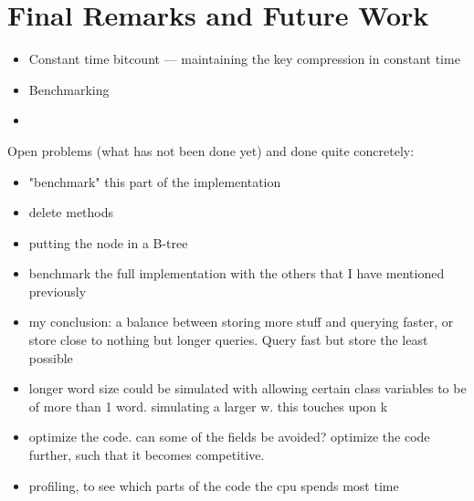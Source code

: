 
\chapter{Final Remarks and Future Work}

\begin{itemize}
    \item
    Constant time bitcount --- maintaining the key compression in constant time
    
    \item
    Benchmarking
    
    \item
    
\end{itemize}

Open problems (what has not been done yet) and done quite concretely:
\begin{itemize}
    \item
    "benchmark" this part of the implementation
    
    \item
    delete methods
    
    \item
    putting the node in a B-tree
    
    \item
    benchmark the full implementation with the others that I have mentioned previously
    
    \item
    my conclusion: a balance between storing more stuff and querying faster, or store close to nothing but longer queries. Query fast but store the least possible
    
    \item
    longer word size could be simulated with allowing certain class variables to be of more than 1 word. simulating a larger w. this touches upon k
    
    \item
    optimize the code. can some of the fields be avoided?
    optimize the code further, such that it becomes competitive.
    
    \item
    profiling, to see which parts of the code the cpu spends most time
\end{itemize}